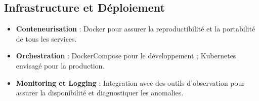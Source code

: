 \subsection{Infrastructure et Déploiement}

\begin{itemize}
    \item \textbf{Conteneurisation} : \Gls{Docker} pour assurer la reproductibilité et la portabilité de tous les services.

    \item \textbf{Orchestration} : \Gls{DockerCompose} pour le développement ; \Gls{Kubernetes} envisagé pour la production.

    \item \textbf{Monitoring et Logging} : Integration avec des outils d'observation pour assurer la disponibilité et diagnostiquer les anomalies.
\end{itemize}